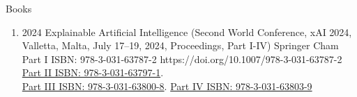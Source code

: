 \headedsubsection %
{Books }{}
{
    \begin{enumerate}

        \item {}
                        {2024}
                        {Explainable Artificial Intelligence (Second World Conference, xAI 2024, Valletta, Malta, July 17–19, 2024, Proceedings, Part I-IV)}
                        {Springer}
                        {Cham}
                        {Part I ISBN: 978-3-031-63787-2}
                        {https://doi.org/10.1007/978-3-031-63787-2}
                        {\href{https://doi.org/10.1007/978-3-031-63797-1}{Part II ISBN: 978-3-031-63797-1}.\\
                         \href{https://doi.org/10.1007/978-3-031-63800-8}{Part III ISBN: 978-3-031-63800-8}.
                         \href{https://doi.org/10.1007/978-3-031-63803-9}{Part IV ISBN: 978-3-031-63803-9}}
    \end{enumerate}

}

